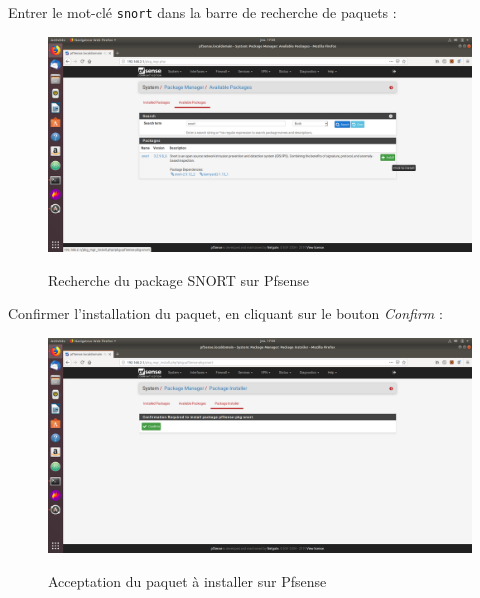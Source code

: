 Entrer le mot-clé \texttt{snort} dans la barre de recherche de paquets :
\begin{figure}[h!]
    \begin{center}
        \includegraphics[scale=0.33]{MISP_Screenshots/Snort/3.png}
        \label{MISP_Screenshots/Snort/3}
        \caption{Recherche du package SNORT sur Pfsense}
    \end{center}
\end{figure}
\FloatBarrier

\pagebreak

Confirmer l'installation du paquet, en cliquant sur le bouton \textit{Confirm} :
\begin{figure}[h!]
    \begin{center}
        \includegraphics[scale=0.33]{MISP_Screenshots/Snort/4.png}
        \label{MISP_Screenshots/Snort/4}
        \caption{Acceptation du paquet à installer sur Pfsense}
    \end{center}
\end{figure}
\FloatBarrier 
    
